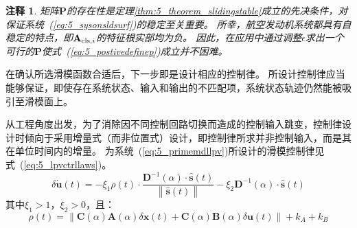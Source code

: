 \documentclass{article}
\newtheorem{remark}{注释}
\begin{document}
\begin{remark}
矩阵$\mathbf{P}$的存在性是定理\ref{thm:5_theorem_slidingstable}成立的先决条件，对保证系统~(\ref{eq:5_sysonsldsurf})的稳定至关重要。
所幸，航空发动机系统都具有自稳定的特点，即$\mathbf{A}_{{\rm{cls}},i}$的特征根实部均为负。
因此，在应用中通过调整$\epsilon$求出一个可行的$\mathbf{P}$使式~(\ref{eq:5_postivedefinep})成立并不困难。
\end{remark}

在确认所选滑模函数合适后，下一步即是设计相应的控制律。
所设计控制律应当能够保证，即使存在系统状态、输入和输出的不匹配项，系统状态轨迹仍然能被吸引至滑模面上。

从工程角度出发，为了消除因不同控制回路切换而造成的控制输入跳变，控制律设计时倾向于采用增量式（而非位置式）设计，即控制律所求并非控制输入，而是其在单位时间内的增量。
为系统~(\ref{eq:5_primemdllpv})所设计的滑模控制律见式~(\ref{eq:5_lpvctrllaws})。
\begin{equation}
\delta \bm{\dot{u}}(t)=-\xi_1 \rho(t) \cdot\frac{\mathbf{D}^{-1}(\alpha)\cdot \bm{\hat s}(t)}{\left \| \bm{\hat s}(t) \right \|}-\xi_2 \mathbf{D}^{-1}(\alpha)\cdot \bm{\hat s}(t)
\label{eq:5_lpvctrllaws}
\end{equation}
其中$\xi_1 >1$，$\xi_2 >0$，且：
\begin{equation}
   \rho(t) = \Big \|\mathbf{C}(\alpha)\mathbf{A}(\alpha)\delta \bm{x}(t)+\mathbf{C}(\alpha)\mathbf{B}(\alpha)\delta \bm{u}(t)\Big \| + k_A+ k_B
\end{equation}
\end{document}
